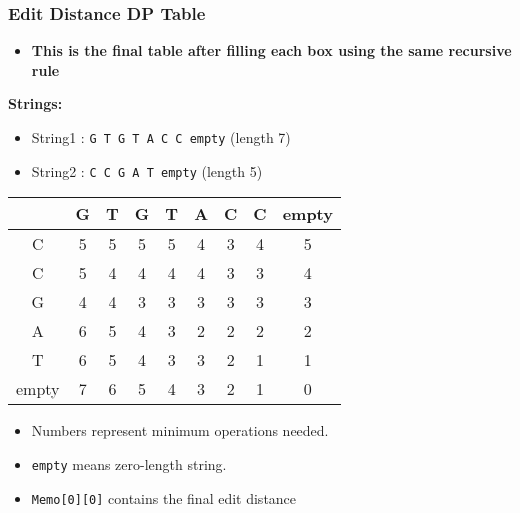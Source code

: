 \documentclass[10pt,aspectratio=43]{beamer}
\begin{document}
    
\begin{frame}
    \frametitle{Edit Distance DP Table}
    \begin{itemize}
                \item \textbf{This is the final table after filling each box using the same recursive rule}  
    \end{itemize}
    \textbf{Strings:} 
    \begin{itemize}
        \item String1 : \texttt{G T G T A C C empty} (length 7)
        \item String2 : \texttt{C C G A T empty} (length 5)
    \end{itemize}
    
    \vspace{0.3cm}
    \begin{center}
    \scriptsize
    \begin{tabular}{|c|c|c|c|c|c|c|c|c|}
        \hline
        & G & T & G & T & A & C & C & empty\\ \hline
        C & 5 & 5 & 5 & 5 & 4 & 3 & 4 & 5 \\ \hline
        C & 5 & 4 & 4 & 4 & 4 & 3 & 3 & 4\\ \hline
        G & 4 & 4 & 3 & 3 & 3 & 3 & 3 & 3\\ \hline
        A & 6 & 5 & 4 & 3 & 2 & 2 & 2 & 2 \\ \hline
        T & 6 & 5 & 4 & 3 & 3 & 2 & 1 & 1 \\ \hline
        empty & 7 & 6 & 5 & 4 & 3 & 2 & 1 & 0 \\ \hline
    \end{tabular}
    \end{center}
    
    \begin{itemize}
        \item Numbers represent minimum operations needed.
        \item \texttt{empty} means zero-length string.
        \item \texttt{Memo[0][0]} contains the final edit distance
        
    \end{itemize}
\end{frame}
\end{document}
